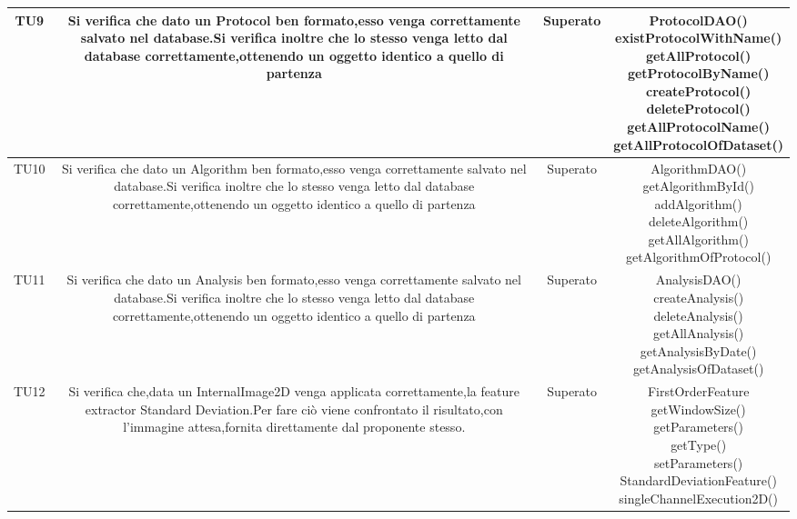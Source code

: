\begin{center}
\begin{longtable}{|c|c|c|c|}
\hline
TU9 & \parbox[t]{\larghezza}{ Si verifica che dato un Protocol ben formato,esso venga correttamente salvato nel database.Si verifica inoltre che lo stesso venga letto dal database correttamente,ottenendo un oggetto identico a quello di partenza  } & Superato & \parbox[t]{\dimTipo} { ProtocolDAO() \\ existProtocolWithName() \\ getAllProtocol() \\ getProtocolByName() \\ createProtocol() \\ deleteProtocol() \\ getAllProtocolName() \\ getAllProtocolOfDataset() \\ } \\
\hline
TU10 & \parbox[t]{\larghezza}{ Si verifica che dato un Algorithm ben formato,esso venga correttamente salvato nel database.Si verifica inoltre che lo stesso venga letto dal database correttamente,ottenendo un oggetto identico a quello di partenza  } & Superato & \parbox[t]{\dimTipo} { AlgorithmDAO() \\ getAlgorithmById() \\ addAlgorithm() \\ deleteAlgorithm() \\ getAllAlgorithm() \\ getAlgorithmOfProtocol() \\ } \\
\hline
TU11 & \parbox[t]{\larghezza}{ Si verifica che dato un Analysis ben formato,esso venga correttamente salvato nel database.Si verifica inoltre che lo stesso venga letto dal database correttamente,ottenendo un oggetto identico a quello di partenza  } & Superato & \parbox[t]{\dimTipo} { AnalysisDAO() \\ createAnalysis() \\ deleteAnalysis() \\ getAllAnalysis() \\ getAnalysisByDate() \\ getAnalysisOfDataset() \\ } \\
\hline
TU12 & \parbox[t]{\larghezza}{ Si verifica che,data un InternalImage2D venga applicata correttamente,la feature extractor Standard Deviation.Per fare ciò viene confrontato il risultato,con l'immagine attesa,fornita direttamente dal proponente stesso. } & Superato & \parbox[t]{\dimTipo} { FirstOrderFeature \\ getWindowSize() \\ getParameters() \\ getType() \\ setParameters() \\ StandardDeviationFeature() \\ singleChannelExecution2D() \\ } \\

\end{longtable}
\end{center}
